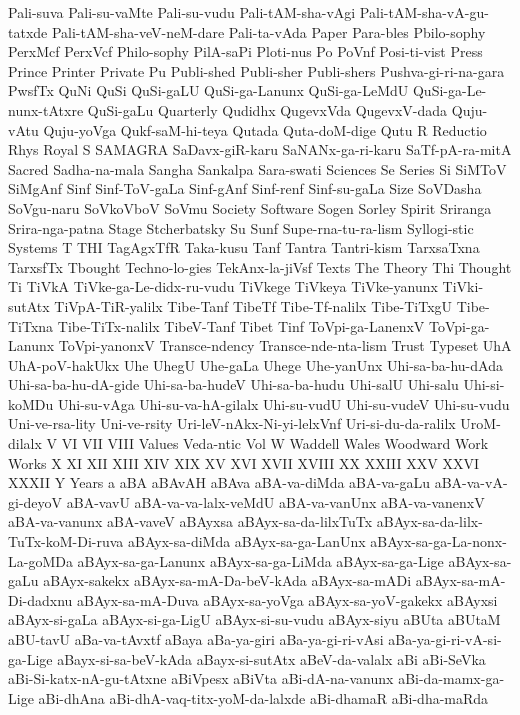 {Pali-suva
Pali-su-vaMte
Pali-su-vudu
Pali-tAM-sha-vAgi
Pali-tAM-sha-vA-gu-tatxde
Pali-tAM-sha-veV-neM-dare
Pali-ta-vAda
Paper
Para-bles
Pbilo-sophy
PerxMcf
PerxVcf
Philo-sophy
PilA-saPi
Ploti-nus
Po
PoVnf
Posi-ti-vist
Press
Prince
Printer
Private
Pu
Publi-shed
Publi-sher
Publi-shers
Pushva-gi-ri-na-gara
PwsfTx
QuNi
QuSi
QuSi-gaLU
QuSi-ga-Lanunx
QuSi-ga-LeMdU
QuSi-ga-Le-nunx-tAtxre
QuSi-gaLu
Quarterly
Qudidhx
QugevxVda
QugevxV-dada
Quju-vAtu
Quju-yoVga
Qukf-saM-hi-teya
Qutada
Quta-doM-dige
Qutu
R
Reductio
Rhys
Royal
S
SAMAGRA
SaDavx-giR-karu
SaNANx-ga-ri-karu
SaTf-pA-ra-mitA
Sacred
Sadha-na-mala
Sangha
Sankalpa
Sara-swati
Sciences
Se
Series
Si
SiMToV
SiMgAnf
Sinf
Sinf-ToV-gaLa
Sinf-gAnf
Sinf-renf
Sinf-su-gaLa
Size
SoVDasha
SoVgu-naru
SoVkoVboV
SoVmu
Society
Software
Sogen
Sorley
Spirit
Sriranga
Srira-nga-patna
Stage
Stcherbatsky
Su
Sunf
Supe-rna-tu-ra-lism
Syllogi-stic
Systems
T
THI
TagAgxTfR
Taka-kusu
Tanf
Tantra
Tantri-kism
TarxsaTxna
TarxsfTx
Tbought
Techno-lo-gies
TekAnx-la-jiVsf
Texts
The
Theory
Thi
Thought
Ti
TiVkA
TiVke-ga-Le-didx-ru-vudu
TiVkege
TiVkeya
TiVke-yanunx
TiVki-sutAtx
TiVpA-TiR-yalilx
Tibe-Tanf
TibeTf
Tibe-Tf-nalilx
Tibe-TiTxgU
Tibe-TiTxna
Tibe-TiTx-nalilx
TibeV-Tanf
Tibet
Tinf
ToVpi-ga-LanenxV
ToVpi-ga-Lanunx
ToVpi-yanonxV
Transce-ndency
Transce-nde-nta-lism
Trust
Typeset
UhA
UhA-poV-hakUkx
Uhe
UhegU
Uhe-gaLa
Uhege
Uhe-yanUnx
Uhi-sa-ba-hu-dAda
Uhi-sa-ba-hu-dA-gide
Uhi-sa-ba-hudeV
Uhi-sa-ba-hudu
Uhi-salU
Uhi-salu
Uhi-si-koMDu
Uhi-su-vAga
Uhi-su-va-hA-gilalx
Uhi-su-vudU
Uhi-su-vudeV
Uhi-su-vudu
Uni-ve-rsa-lity
Uni-ve-rsity
Uri-leV-nAkx-Ni-yi-lelxVnf
Uri-si-du-da-ralilx
UroM-dilalx
V
VI
VII
VIII
Values
Veda-ntic
Vol
W
Waddell
Wales
Woodward
Work
Works
X
XI
XII
XIII
XIV
XIX
XV
XVI
XVII
XVIII
XX
XXIII
XXV
XXVI
XXXII
Y
Years
a
aBA
aBAvAH
aBAva
aBA-va-diMda
aBA-va-gaLu
aBA-va-vA-gi-deyoV
aBA-vavU
aBA-va-va-lalx-veMdU
aBA-va-vanUnx
aBA-va-vanenxV
aBA-va-vanunx
aBA-vaveV
aBAyxsa
aBAyx-sa-da-lilxTuTx
aBAyx-sa-da-lilx-TuTx-koM-Di-ruva
aBAyx-sa-diMda
aBAyx-sa-ga-LanUnx
aBAyx-sa-ga-La-nonx-La-goMDa
aBAyx-sa-ga-Lanunx
aBAyx-sa-ga-LiMda
aBAyx-sa-ga-Lige
aBAyx-sa-gaLu
aBAyx-sakekx
aBAyx-sa-mA-Da-beV-kAda
aBAyx-sa-mADi
aBAyx-sa-mA-Di-dadxnu
aBAyx-sa-mA-Duva
aBAyx-sa-yoVga
aBAyx-sa-yoV-gakekx
aBAyxsi
aBAyx-si-gaLa
aBAyx-si-ga-LigU
aBAyx-si-su-vudu
aBAyx-siyu
aBUta
aBUtaM
aBU-tavU
aBa-va-tAvxtf
aBaya
aBa-ya-giri
aBa-ya-gi-ri-vAsi
aBa-ya-gi-ri-vA-si-ga-Lige
aBayx-si-sa-beV-kAda
aBayx-si-sutAtx
aBeV-da-valalx
aBi
aBi-SeVka
aBi-Si-katx-nA-gu-tAtxne
aBiVpesx
aBiVta
aBi-dA-na-vanunx
aBi-da-mamx-ga-Lige
aBi-dhAna
aBi-dhA-vaq-titx-yoM-da-lalxde
aBi-dhamaR
aBi-dha-maRda
}
